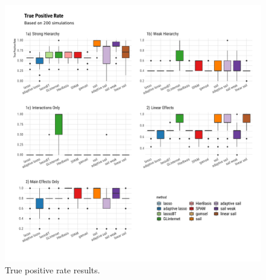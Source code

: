 \documentclass[12pt,letter]{article}\usepackage[]{graphicx}\usepackage[]{color}
\newenvironment{knitrout}{}{} %
\begin{document}
\begin{knitrout}\scriptsize
{}\color{fgcolor}\begin{figure}[H]

{\centering \includegraphics[width=1\linewidth]{figure/plot-tpr-sim-1} 

}

\caption[True positive rate results]{True positive rate results.}\label{fig:plot-tpr-sim}
\end{figure}


\end{knitrout}
\end{document}
